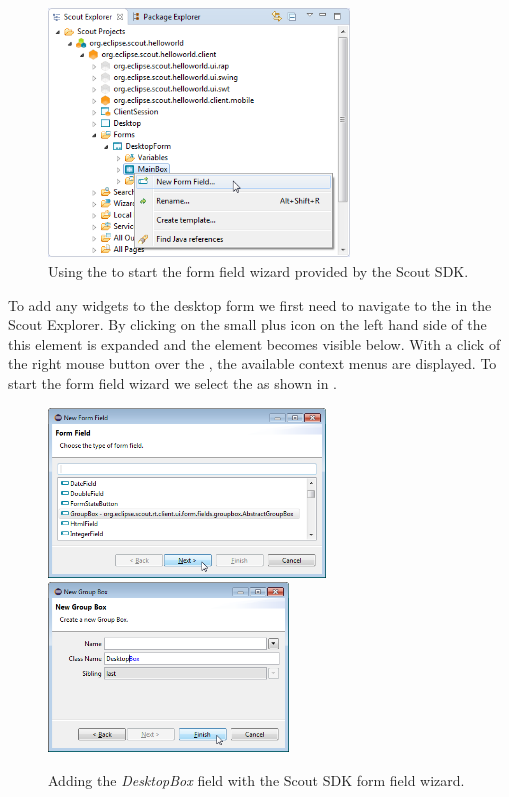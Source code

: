 \documentclass[a4paper,10pt,twoside]{book}
\begin{document}
\begin{figure}
\includegraphics[width=8cm]{sdk_new_field_wizard_menu.png} 
\caption{Using the  to start the form field wizard provided by the Scout SDK.}
\end{figure}

To add any widgets to the desktop form we first need to navigate to the  in the Scout Explorer.
By clicking on the small plus icon on the left hand side of the  this element is expanded and the  element becomes visible below.
With a click of the right mouse button over the , the available context menus are displayed.
To start the form field wizard we select the  as shown in .

\begin{figure}
\includegraphics[height=4.5cm]{sdk_new_field_groupbox_1.png} \hspace{8mm}
\includegraphics[height=4.5cm]{sdk_new_field_groupbox_2.png}
\caption{Adding the \textit{DesktopBox} field with the Scout SDK form field wizard.}
\end{figure}
\end{document}
